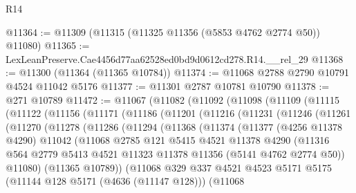 \begin{lexlean}{R14}
\begin{coremodule}
@11364 := @11309 (@11315 (@11325 @11356 (@5853 @4762 @2774 @50)) @11080)
@11365 := LexLeanPreserve.Cae4456d77aa62528ed0bd9d0612cd278.R14.__rel_29
@11368 := @11300 (@11364 (@11365 @10784))
@11374 := @11068 @2788 @2790 @10791 @4524 @11042 @5176
@11377 := @11301 @2787 @10781 @10790
@11378 := @271 @10789
@11472 := @11067
    (@11082
      (@11092
        (@11098
          (@11109
            (@11115
              (@11122
                (@11156
                  (@11171
                    (@11186
                      (@11201
                        (@11216
                          (@11231
                            (@11246
                              (@11261
                                (@11270
                                  (@11278
                                    (@11286
                                      (@11294
                                        (@11368
                                          (@11374
                                            (@11377
                                              (@4256 @11378 @4290)
                                              @11042
                                              (@11068
                                                @2785
                                                @121
                                                @5415
                                                @4521
                                                @11378
                                                @4290
                                                (@11316
                                                  @564
                                                  @2779
                                                  @5413
                                                  @4521
                                                  @11323
                                                  @11378
                                                  @11356
                                                  (@5141 @4762 @2774 @50))
                                                @11080)
                                              (@11365 @10789))
                                            (@11068
                                              @329
                                              @337
                                              @4521
                                              @4523
                                              @5171
                                              @5175
                                              (@11144 @128 @5171 (@4636 (@11147 @128)))
                                              (@11068

\end{coremodule}
\end{lexlean}
